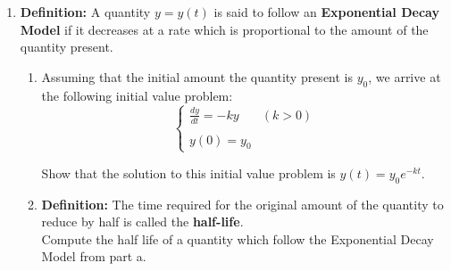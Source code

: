 \documentclass[12pt]{article}
\newif\ifans
\begin{document}
\begin{enumerate}
\item {\bf Definition:} A quantity $y=y(t)$ is said to follow an {\bf Exponential Decay Model} if it decreases at a rate which is proportional to the amount of the quantity present.

\begin{enumerate}

\item Assuming that the initial amount the quantity present is $y_0$, we arrive at the following initial value problem: $$\left\{\begin{array}{ll} \frac{dy}{dt}=-ky & (k>0)\\
 & \\
y(0)=y_0& \end{array}\right.$$

Show that the solution to this initial value problem is $y(t)=y_0e^{-kt}$.

\item {\bf Definition:} The time required for the original amount of the quantity to reduce by half is called the {\bf half-life}.\\

Compute the half life of a quantity which follow the Exponential Decay Model from part a.

\ifans{\fbox{$t_{1/2}=\frac{\ln{2}}{k}$}} \fi

\end{enumerate}

\end{enumerate}

\newpage

\end{document}
